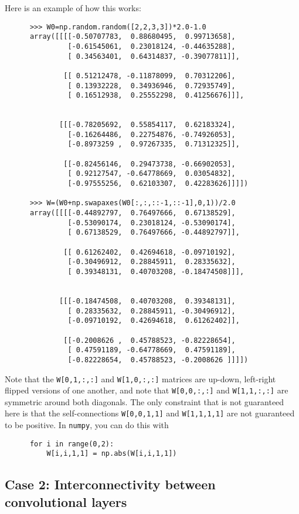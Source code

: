 \documentclass[11pt,letterpaper]{article}
\begin{document}
\newpage
Here is an example of how this works:
\begin{verbatim}
      >>> W0=np.random.random([2,2,3,3])*2.0-1.0
      array([[[[-0.50707783,  0.88680495,  0.99713658],
               [-0.61545061,  0.23018124, -0.44635288],
               [ 0.34563401,  0.64314837, -0.39077811]],

              [[ 0.51212478, -0.11878099,  0.70312206],
               [ 0.13932228,  0.34936946,  0.72935749],
               [ 0.16512938,  0.25552298,  0.41256676]]],


             [[[-0.78205692,  0.55854117,  0.62183324],
               [-0.16264486,  0.22754876, -0.74926053],
               [-0.8973259 ,  0.97267335,  0.71312325]],

              [[-0.82456146,  0.29473738, -0.66902053],
               [ 0.92127547, -0.64778669,  0.03054832],
               [-0.97555256,  0.62103307,  0.42283626]]]])

      >>> W=(W0+np.swapaxes(W0[:,:,::-1,::-1],0,1))/2.0
      array([[[[-0.44892797,  0.76497666,  0.67138529],
               [-0.53090174,  0.23018124, -0.53090174],
               [ 0.67138529,  0.76497666, -0.44892797]],

              [[ 0.61262402,  0.42694618, -0.09710192],
               [-0.30496912,  0.28845911,  0.28335632],
               [ 0.39348131,  0.40703208, -0.18474508]]],


             [[[-0.18474508,  0.40703208,  0.39348131],
               [ 0.28335632,  0.28845911, -0.30496912],
               [-0.09710192,  0.42694618,  0.61262402]],

              [[-0.2008626 ,  0.45788523, -0.82228654],
               [ 0.47591189, -0.64778669,  0.47591189],
               [-0.82228654,  0.45788523, -0.2008626 ]]]])
\end{verbatim}
Note that the {\tt W[0,1,:,:]} and {\tt W[1,0,:,:]} matrices are up-down, 
left-right flipped versions of one another, and note that {\tt W[0,0,:,:]} and 
{\tt W[1,1,:,:]} are symmetric around both diagonals.  The only constraint 
that is not guaranteed here is that the self-connections {\tt W[0,0,1,1]} and 
{\tt W[1,1,1,1]} are not guaranteed to be positive. In {\tt numpy}, you can
do this with
\begin{verbatim}
      for i in range(0,2):
          W[i,i,1,1] = np.abs(W[i,i,1,1])
      \end{verbatim}



\subsection{Case 2: Interconnectivity between convolutional layers}
\end{document}
